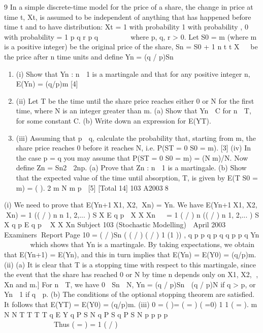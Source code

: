 \documentclass[a4paper,12pt]{article}
\begin{document}
\begin{enumerate}

9 In a simple discrete-time model for the price of a share, the change in price at time t, Xt, is assumed to be independent of anything that has happened before time t and to
have distribution:
Xt =
1 with probability
1 with probability ,
0 with probability = 1
p
q
r p q

 
  
where p, q, r > 0.
Let S0 = m (where m is a positive integer) be the original price of the share,
Sn = S0 + 1
n
t t X
  be the price after n time units and define
Yn = (q / p)Sn
\begin{enumerate}
\item (i)  Show that {Yn : n  1} is a martingale and that for any positive integer n,
E(Yn) = (q/p)m [4]
\item (ii)  Let T be the time until the share price reaches either 0 or N for the first time,
where N is an integer greater than m.
(a) Show that 
Yn
  C for n  T, for some constant C.
(b) Write down an expression for E(YT).
\item 
(iii) Assuming that p  q, calculate the probability that, starting from m, the share price reaches 0 before it reaches N, i.e. P(ST = 0 
S0 = m). [3]
(iv) In the case p = q you may assume that P(ST = 0 
S0 = m) = (Nm)/N. Now
define Zn = Sn2  2np.
(a) Prove that {Zn : n  1} is a martingale.
(b) Show that the expected value of the time until absorption, T, is given
by
E(T
S0 = m) = ( ).
2
m N m
p

[5]
[Total 14]
103 A20038
\end{enumerate}
 (i) We need to prove that E(Yn+1X1, X2, Xn) = Yn.
We have
E(Yn+1X1, X2, Xn) = 1 (( / ) n n 1, 2,... ) S X
E q p  X X Xn
 
= 1 ( / ) n (( / ) n 1, 2,... ) S X
q p E q p  X X Xn
Subject 103 (Stochastic Modelling)  April 2003  Examiners Report
Page 10
= ( / )Sn ( ( / ) ( / ) 1 (1 )) ,
q p p q p q q p p q Yn      
which shows that Yn is a martingale.
By taking expectations, we obtain that E(Yn+1) = E(Yn), and this in turn implies that E(Yn) = E(Y0) = (q/p)m.
(ii) (a) It is clear that T is a stopping time with respect to this martingale, since
the event that the share has reached 0 or N by time n depends only on
X1, X2, , Xn and m.]
For n  T, we have 0  Sn  N,
Yn = (q / p)Sn  (q / p)N if q > p, or Yn  1 if q  p.
(b) The conditions of the optional stopping theorem are satisfied. It
follows that E(YT) = E(Y0) = (q/p)m.
(iii)
0
= ( )= ( = ) ( =0) 1 1 ( = ).
m N N
T T T T
q E Y q P S N q P S q P S N
p p p p
         
               	  	  	   	   	
Thus ( = ) = 1 ( / )

\end{enumerate}
\end{document}
